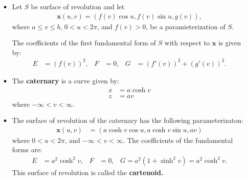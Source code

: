 \documentclass[10pt]{article}
\newcommand{\dee}{\mathrm{d}}
\newcommand{\ve}[1]{\mathbf{#1}}
\begin{document}
\begin{itemize}
    \begin{proof}
      Let $p \in \ve{x}(U)$ and $w \in T_p(S)$. Then, $w$ is tangent ot a curve $\ve{x}(\alpha(t))$ at $t = 0$, where $\alpha(t) = (u(t), v(t))$ is a curve in $U$. Thus, $w$ may be written as:
      \begin{align*}
        w = \ve{x}_u u' + \ve{x}_v v'.
      \end{align*}
      By definition, the vector $\dee \varphi_p(w)$ is tangent to the curve $\varphi(\ve{x}(\alpha(t))) = \bar{\ve{x}} \circ \ve{x}^{-1} \circ \ve{x}(\alpha(t)) = \bar{\ve{x}}(\alpha(t)).$ Hence,
      \begin{align*}
        \dee \varphi_p(w) = \bar{\ve{x}}_u u' + \bar{\ve{x}}_v v'.
      \end{align*}
      Since,
      \begin{align*}
        I_p(w) &= E(u')^2 + Fu'v' + G (v')^2\\
        I_{\varphi(p)}(\dee\varphi_p(w)) &= \bar E(u')^2 + \bar Fu'v' + \bar G (v')^2,
      \end{align*}
      we can conclude that $I_p(w) = I_{\var\phi(p)}(\dee\varphi_p(w))$ for all $p \in \ve{x}(U)$. So, $\varphi$ is a local isoemetry.
    \end{proof}

    \item Let $S$ be surface of revolution and let
    \begin{align*}
      \ve{x}(u,v) = (f(v) \cos u, f(v) \sin u, g(v)),
    \end{align*}
    where $a \leq v \leq b$, $0 < u < 2\pi$, and $f(v) > 0$, be a paramieterization of $S$.

    The coefficients of the first fundamental form of $S$ with respect to $\ve{x}$ is given by:
    \begin{align*}
      E &= (f(v))^2, & F &= 0, & G &= (f'(v))^2 + (g'(v))^2.
    \end{align*}

    \item The {\bf caternary} is a curve given by:
    \begin{align*}
      x &= a \cosh v\\
      z &= av
    \end{align*}
    where $-\infty < v < \infty$.

    \item The surface of revolution of the caternary has the following parameterizaton:
    \begin{align*}
      \ve{x}(u,v) &= (a \cosh v \cos u, a \cosh v \sin u, av)
    \end{align*}
    where $0 < u < 2\pi$, and $-\infty < v < \infty$. The coefficients of the fundamental forms are:
    \begin{align*}
      E &= a^2 \cosh^2 v, & F &= 0, & G = a^2(1 + \sinh^2 v) = a^2 \cosh^2 v.
    \end{align*}
    This surface of revolution is called the {\bf cartenoid.}


\end{itemize}
\end{document}
